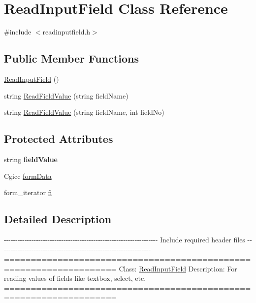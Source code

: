 \hypertarget{classReadInputField}{\section{\-Read\-Input\-Field \-Class \-Reference}
\label{classReadInputField}
}


{\ttfamily \#include $<$readinputfield.\-h$>$}

\subsection*{\-Public \-Member \-Functions}
\begin{DoxyCompactItemize}
\item 
\hyperlink{classReadInputField_aae743343381035c28a3a0111fc353c7f}{\-Read\-Input\-Field} ()
\item 
string \hyperlink{classReadInputField_a7f6e49b47412649644cc644927ccc682}{\-Read\-Field\-Value} (string field\-Name)
\item 
string \hyperlink{classReadInputField_accf7ceba77721a35968c69268e4e559e}{\-Read\-Field\-Value} (string field\-Name, int field\-No)
\end{DoxyCompactItemize}
\subsection*{\-Protected \-Attributes}
\begin{DoxyCompactItemize}
\item 
\hypertarget{classReadInputField_a0d95496b5fc8fb4badd4af19492182ae}{string {\bfseries field\-Value}}\label{classReadInputField_a0d95496b5fc8fb4badd4af19492182ae}

\item 
\-Cgicc \hyperlink{classReadInputField_a1e4ebac8979fd9b2771320d669fce5fc}{form\-Data}
\item 
form\-\_\-iterator \hyperlink{classReadInputField_ae252dc321be04c2c1afa6928ad16a45d}{fi}
\end{DoxyCompactItemize}


\subsection{\-Detailed \-Description}
-\/-\/-\/-\/-\/-\/-\/-\/-\/-\/-\/-\/-\/-\/-\/-\/-\/-\/-\/-\/-\/-\/-\/-\/-\/-\/-\/-\/-\/-\/-\/-\/-\/-\/-\/-\/-\/-\/-\/-\/-\/-\/-\/-\/-\/-\/-\/-\/-\/-\/-\/-\/-\/-\/-\/-\/-\/-\/-\/-\/-\/-\/-\/-\/-\/-\/-\/ \-Include required header files -\/-\/-\/-\/-\/-\/-\/-\/-\/-\/-\/-\/-\/-\/-\/-\/-\/-\/-\/-\/-\/-\/-\/-\/-\/-\/-\/-\/-\/-\/-\/-\/-\/-\/-\/-\/-\/-\/-\/-\/-\/-\/-\/-\/-\/-\/-\/-\/-\/-\/-\/-\/-\/-\/-\/-\/-\/-\/-\/-\/-\/-\/-\/-\/-\/-\/ =================================================================== \-Class\-: \hyperlink{classReadInputField}{\-Read\-Input\-Field} \-Description\-: \-For reading values of fields like textbox, select, etc. =================================================================== 


